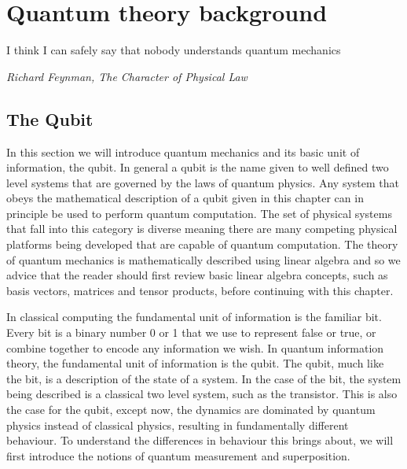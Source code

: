 \chapter{Quantum theory background}
\label{chpt:background}




\epigraph{I think I can safely say that nobody understands quantum mechanics}{\textit{Richard Feynman, The Character of Physical Law}}

\section{The Qubit}\label{TheBasics}

In this section we will introduce quantum mechanics and its basic unit of information, the qubit. In general a qubit is the name given to well defined two level systems that are governed by the laws of quantum physics. Any system that obeys the mathematical description of a qubit given in this chapter can in principle be used to perform quantum computation. The set of physical systems that fall into this category is diverse meaning there are many competing physical platforms being developed that are capable of quantum computation. The theory of quantum mechanics is mathematically described using linear algebra and so we advice that the reader should first review basic linear algebra concepts, such as basis vectors, matrices and tensor products, before continuing with this chapter.

In classical computing the fundamental unit of information is the familiar bit. Every bit is a binary number 0 or 1 that we use to represent false or true, or combine together to encode any information we wish. In quantum information theory, the fundamental unit of information is the qubit. The qubit, much like the bit, is a description of the state of a system. In the case of the bit, the system being described is a classical two level system, such as the transistor. This is also the case for the qubit, except now, the dynamics are dominated by quantum physics instead of classical physics, resulting in fundamentally different behaviour. To understand the differences in behaviour this brings about, we will first introduce the notions of quantum measurement and superposition.

